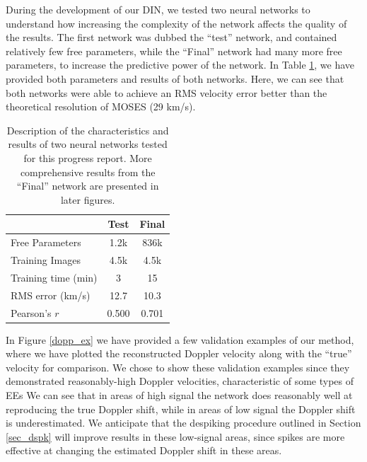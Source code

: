 \documentclass[10pt,letterpaper]{article}
\newcommand{\DIN}{\ac{DIN}}
\begin{document}
				During the development of our \DIN, we tested two neural networks to understand how increasing the complexity of the network affects the quality of the results.
				The first network was dubbed the ``test'' network, and contained relatively few free parameters, while the ``Final'' network had many more free parameters, to increase the predictive power of the network.
				In Table \ref{nn_table}, we have provided both parameters and results of both networks.
				Here, we can see that both networks were able to achieve an RMS velocity error better than the theoretical resolution of MOSES (29 km/s).
				
				\begin{table}[h!]
					
					\centering
					\begin{tabular}{| l | c c |}
						\hline
						& Test & Final \\ \hline
						Free Parameters & 1.2k & 836k \\
						Training Images & 4.5k & 4.5k \\				
						Training time (min) & 3 & 15 \\ 
						RMS error (km/s) & 12.7 & 10.3 \\
						Pearson's $r$ & 0.500 & 0.701 \\ \hline				
					\end{tabular}					
					\caption{Description of the characteristics and results of two neural networks tested for this progress report. More comprehensive results from the ``Final'' network are presented in later figures.}
					\label{nn_table}
					
				\end{table}
				
				In Figure \ref{dopp_ex} we have provided a few validation examples of our method, where we have plotted the reconstructed Doppler velocity along with the ``true'' velocity for comparison. 
				We chose to show these validation examples since they demonstrated reasonably-high Doppler velocities, characteristic of some types of \acp{EE}
				We can see that in areas of high signal the network does reasonably well at reproducing the true Doppler shift, while in areas of low signal the Doppler shift is underestimated.
				We anticipate that the despiking procedure outlined in Section \ref{sec_dspk} will improve results in these low-signal areas, since spikes are more effective at changing the estimated Doppler shift in these areas.
			
\end{document}

